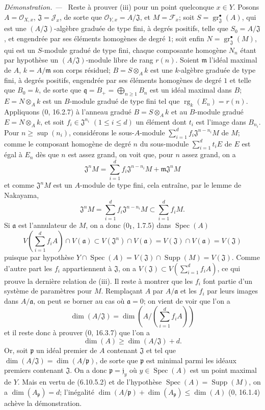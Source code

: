 \documentclass[10pt,oneside]{book}
\newenvironment{proof}{%
  \par\medskip\noindent\textit{Démonstration. ---\ }}{\par}
\begin{document}
\begin{proof}
Reste à prouver (iii) pour un point quelconque $x\in Y$. Posons
$A=\mathcal O_{X,x}$, $\mathfrak J=\mathcal J_x$, de sorte que
$\mathcal O_{Y,x}=A/\mathfrak J$, et $M=\mathcal F_x$; soit
$S=\operatorname{gr}_{\mathfrak J}^{\bullet}(A)$, qui est une
$(A/\mathfrak J)$-algèbre graduée de type fini, à degrés positifs, telle
que $S_0=A/\mathfrak J$, et engendrée par ses éléments homogènes de degré
$1$; soit enfin
$N=\operatorname{gr}_{\mathfrak J}^{\bullet}(M)$, qui est un $S$-module
gradué de type fini, chaque composante homogène $N_n$ étant par hypothèse
un $(A/\mathfrak J)$-module libre de rang $r(n)$. Soient $\mathfrak m$
l'idéal maximal de $A$, $k=A/\mathfrak m$ son corps résiduel;
$B=S\otimes_A k$ est une $k$-algèbre graduée de type fini, à degrés
positifs, engendrée par ses éléments homogènes de degré $1$ et telle que
$B_0=k$, de sorte que $\mathfrak q=B_+=\bigoplus_{n\geq1}B_n$ est un idéal
maximal dans $B$; $E=N\otimes_A k$ est un $B$-module gradué de type fini
tel que $\operatorname{rg}_k(E_n)=r(n)$. Appliquons (0, 16.2.7) à l'anneau
gradué $B=S\otimes_A k$ et au $B$-module gradué $E=N\otimes_A k$, et soit
$f_i\in\mathfrak J^{n_i}$ $(1\leq i\leq d)$ un élément dont $t_i$ est
l'image dans $B_{n_i}$. Pour $n\geq\sup(n_i)$, considérons le sous-$A$-module
$\sum_{i=1}^{d}f_i\mathfrak J^{n-n_i}M$ de $M$; comme le composant homogène
de degré $n$ du sous-module $\sum_{i=1}^{d}t_iE$ de $E$ est égal à
$E_n$ dès que $n$ est assez grand, on voit que, pour $n$ assez grand, on a
\[
\mathfrak J^nM=\sum_{i=1}^{d}f_i\mathfrak J^{n-n_i}M+
\mathfrak m\mathfrak J^nM
\]
et comme $\mathfrak J^nM$ est un $A$-module de type fini, cela entraîne,
par le lemme de Nakayama,
\[
\mathfrak J^nM=\sum_{i=1}^{d}f_i\mathfrak J^{n-n_i}M
\subset\sum_{i=1}^{d}f_iM.
\]
Si $\mathfrak a$ est l'annulateur de $M$, on a donc (0$_{\rm I}$, 1.7.5)
dans $\operatorname{Spec}(A)$
\[
V\left(\sum_{i=1}^{d}f_iA\right)\cap V(\mathfrak a)
\subset V(\mathfrak J^n)\cap V(\mathfrak a)
=V(\mathfrak J)\cap V(\mathfrak a)=V(\mathfrak J)
\]
puisque par hypothèse
$Y\cap\operatorname{Spec}(A)=V(\mathfrak J)\cap\operatorname{Supp}(M)
=V(\mathfrak J)$. Comme d'autre part les $f_i$ appartiennent à
$\mathfrak J$, on a
$V(\mathfrak J)\subset V(\sum_{i=1}^{d}f_iA)$, ce qui prouve la dernière
relation de (iii). Il reste à montrer que les $f_i$ font partie d'un système
de paramètres pour $M$. Remplaçant $A$ par $A/\mathfrak a$ et les $f_i$ par
leurs images dans $A/\mathfrak a$, on peut se borner au cas où
$\mathfrak a=0$; on vient de voir que l'on a
\[
\dim(A/\mathfrak J)=
\dim\left(A/\left(\sum_{i=1}^{d}f_iA\right)\right)
\]
et il reste donc à prouver (0, 16.3.7) que l'on a
\[
\dim(A)\geq\dim(A/\mathfrak J)+d.
\]
Or, soit $\mathfrak p$ un idéal premier de $A$ contenant $\mathfrak J$ et
tel que $\dim(A/\mathfrak J)=\dim(A/\mathfrak p)$, de sorte que
$\mathfrak p$ est minimal parmi les idéaux premiers contenant
$\mathfrak J$. On a donc $\mathfrak p=\mathfrak j_y$ où
$y\in\operatorname{Spec}(A)$ est un point maximal de $Y$. Mais en vertu de
(6.10.5.2) et de l'hypothèse
$\operatorname{Spec}(A)=\operatorname{Supp}(M)$, on a
$\dim(A_{\mathfrak p})=d$; l'inégalité
$\dim(A/\mathfrak p)+\dim(A_{\mathfrak p})\leq\dim(A)$ (0, 16.1.4)
achève la démonstration.
\end{proof}
\end{document}
